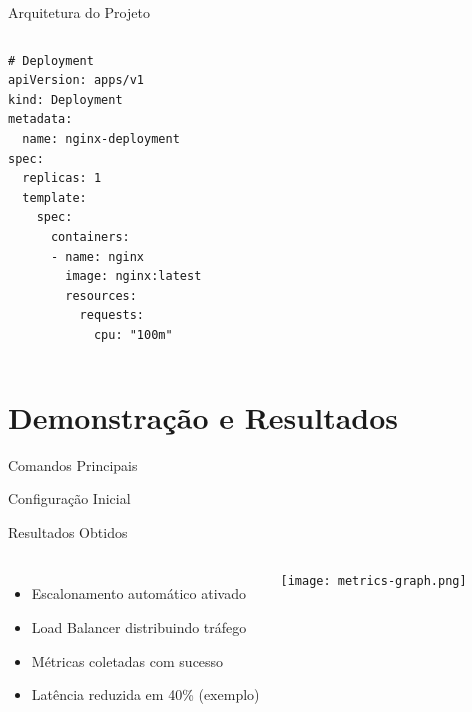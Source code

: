\documentclass{beamer}
\begin{document}
\begin{frame}[fragile]{Arquitetura do Projeto}
    \begin{columns}
        \begin{lstlisting}
# Deployment
apiVersion: apps/v1
kind: Deployment
metadata:
  name: nginx-deployment
spec:
  replicas: 1
  template:
    spec:
      containers:
      - name: nginx
        image: nginx:latest
        resources:
          requests:
            cpu: "100m"
        \end{lstlisting}

    \end{columns}
\end{frame}

\section{Demonstração e Resultados}

\begin{frame}{Comandos Principais}
    \begin{exampleblock}{Configuração Inicial}
        
    \end{exampleblock}
\end{frame}

\begin{frame}{Resultados Obtidos}
    \begin{columns}
        \begin{itemize}
            \item Escalonamento automático ativado
            \item Load Balancer distribuindo tráfego
            \item Métricas coletadas com sucesso
            \item Latência reduzida em 40\% (exemplo)
        \end{itemize}

        \centering
        \texttt{[image: metrics-graph.png]}
    \end{columns}
\end{frame}
\end{document}
